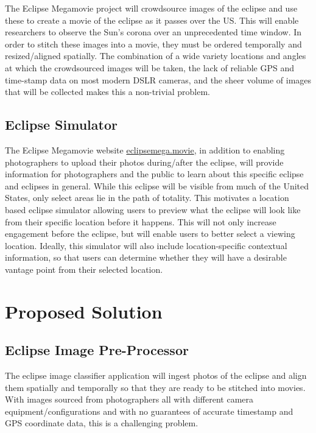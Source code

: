 \documentclass[10pt, onecolumn, draftclsnofoot, letterpaper]{IEEEtran}
\begin{document}
The Eclipse Megamovie project will crowdsource images of the eclipse and use 
these to create a movie of the eclipse as it passes over the US. This will 
enable researchers to observe the Sun's corona over an unprecedented time 
window. In order to stitch these images into a movie, they must be ordered 
temporally and resized/aligned spatially. The combination of a wide variety 
locations and angles at which the crowdsourced images will be taken, the lack 
of reliable GPS and time-stamp data on most modern DSLR cameras, and the sheer 
volume of images that will be collected makes this a non-trivial problem.

\subsection{Eclipse Simulator}
The Eclipse Megamovie website \href{http://eclipsemega.movie}{eclipsemega.movie}, in addition to enabling 
photographers to upload their photos during/after the eclipse, will provide 
information for photographers and the public to learn about this specific 
eclipse and eclipses in general. While this eclipse will be visible from 
much of the United States, only select areas lie in the path of totality. 
This motivates a location based eclipse simulator allowing users to preview 
what the eclipse will look like from their specific location before it 
happens. This will not only increase engagement before the eclipse, but 
will enable users to better select a viewing location. Ideally, this 
simulator will also include location-specific contextual information, 
so that users can determine whether they  will have  a desirable vantage 
point from their selected location.

\newpage

\section{Proposed Solution}

\subsection{Eclipse Image Pre-Processor}
The eclipse image classifier application will ingest photos of the eclipse and 
align them spatially and temporally so that they are ready to be stitched into 
movies. With images sourced from photographers all with different camera 
equipment/configurations and with no guarantees of accurate timestamp and 
GPS coordinate data, this is a challenging problem.
\end{document}
